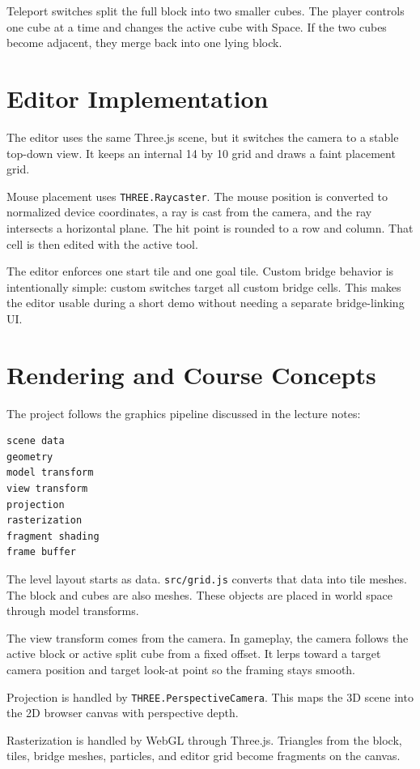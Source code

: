 \documentclass[11pt,a4paper]{article}
\newcommand{\code}[1]{\texttt{#1}}
\begin{document}
Teleport switches split the full block into two smaller cubes. The player controls one cube at a time and changes the active cube with Space. If the two cubes become adjacent, they merge back into one lying block.

\section{Editor Implementation}

The editor uses the same Three.js scene, but it switches the camera to a stable top-down view. It keeps an internal 14 by 10 grid and draws a faint placement grid.

Mouse placement uses \code{THREE.Raycaster}. The mouse position is converted to normalized device coordinates, a ray is cast from the camera, and the ray intersects a horizontal plane. The hit point is rounded to a row and column. That cell is then edited with the active tool.

The editor enforces one start tile and one goal tile. Custom bridge behavior is intentionally simple: custom switches target all custom bridge cells. This makes the editor usable during a short demo without needing a separate bridge-linking UI.

\section{Rendering and Course Concepts}

The project follows the graphics pipeline discussed in the lecture notes:

\begin{lstlisting}
scene data
geometry
model transform
view transform
projection
rasterization
fragment shading
frame buffer
\end{lstlisting}

The level layout starts as data. \code{src/grid.js} converts that data into tile meshes. The block and cubes are also meshes. These objects are placed in world space through model transforms.

The view transform comes from the camera. In gameplay, the camera follows the active block or active split cube from a fixed offset. It lerps toward a target camera position and target look-at point so the framing stays smooth.

Projection is handled by \code{THREE.PerspectiveCamera}. This maps the 3D scene into the 2D browser canvas with perspective depth.

Rasterization is handled by WebGL through Three.js. Triangles from the block, tiles, bridge meshes, particles, and editor grid become fragments on the canvas.
\end{document}
